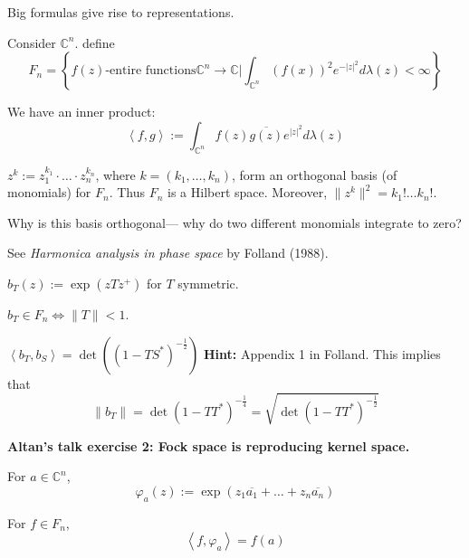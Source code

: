 Big formulas give rise to representations.

\medskip{}
Consider $\mathbb{C}^{n}$. define
$$F_n=\left\{\text{$f(z)$-entire functions
$\mathbb{C}^{n}\to \mathbb{C}$}\Big|
\int_{\mathbb{C}^{n}}(f(x))^2e^{-|z|^2}
d\lambda(z)<\infty\right\}$$

We have an inner product:
$$\left\langle{} f,g \right\rangle{}
:=\int_{\mathbb{C}^{n}}f(z)\overline{g(z)}
e^{|z|^2}d
\lambda(z)$$

\begin{proposition}
\label{proposition-erdnigor-monomials}
$z^k:=z_1^{k_1}\cdot\ldots\cdot z_n^{k_n}$,
where $k=(k_1,\ldots,k_n)$, form an
orthogonal basis (of monomials) for $F_n$.
Thus $F_n$ is a Hilbert space. Moreover,
$\|z^k\|^2=k_1!\ldots k_n!$.
\end{proposition}

\medskip{}
Why is this basis orthogonal--- why do two
different monomials integrate to zero?

\begin{remark}
\label{remark-erdnigor-folland}
See {\it Harmonica analysis in phase space}
by Folland (1988).
\end{remark}

\begin{definition}
\label{definition-erdnigor-bt}
$b_T(z):=\operatorname{exp}(zTz^+)$ for $T$
symmetric.
\end{definition}

\medskip{}
$b_T\in F_n \iff \|T\|<1$.

\begin{exercise}
\label{exercise-erdnigor-bt}
$\left\langle{} b_T,b_S \right\rangle{} =\det
( (1-TS^*)^{-\frac{1}{2}} )$ {\bf Hint:}
Appendix 1 in Folland. This implies that
$$\|b_T\|=\det (1-T T^*
)^{-\frac{1}{4}}=\sqrt{\det (1-T
T^*)^{-\frac{1}{2}}}$$
\end{exercise}

\medskip\noindent
{\bf Altan's talk exercise 2: Fock space is
reproducing kernel space.}

\begin{definition}
\label{definition-erdnigor-coherent}
For $a\in \mathbb{C}^{n}$,
$$\varphi_a(z):=\operatorname{exp}
(z_1\overline{a_1}+\ldots
+z_n\overline{a_n})$$
\end{definition}

\medskip{}
For $f\in F_n$,
$$\left\langle{} f,\varphi_a \right\rangle{}
=f(a)$$


